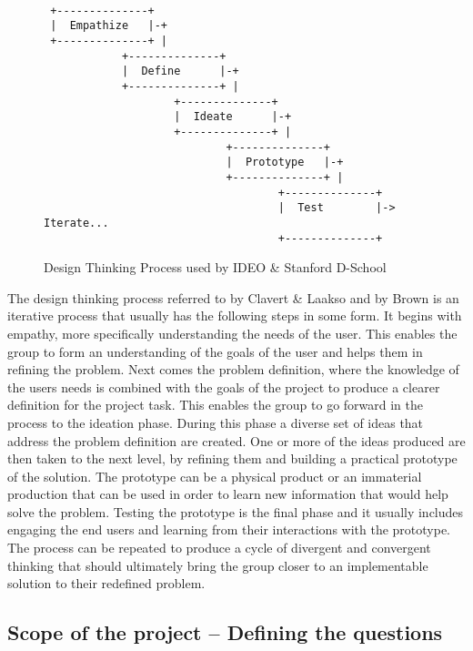 \documentclass[english,12pt,a4paper,pdftex]{article}
\begin{document}

\begin{figure}
\begin{verbatim}
 
 +--------------+
 |  Empathize   |-+
 +--------------+ |
            +--------------+
            |  Define      |-+
            +--------------+ |
                    +--------------+
                    |  Ideate      |-+
                    +--------------+ |
                            +--------------+
                            |  Prototype   |-+
                            +--------------+ |
                                    +--------------+
                                    |  Test        |-> Iterate...
                                    +--------------+
\end{verbatim}
\caption{Design Thinking Process used by IDEO \& Stanford D-School}
\label{fig:dt-process}
\end{figure}

The design thinking process referred to by Clavert \& Laakso \cite{Clavert} and by Brown \cite{Brown} is an iterative process that usually has the following steps in some form. It begins with empathy, more specifically understanding the needs of the user. This enables the group to form an understanding of the goals of the user and helps them in refining the problem. Next comes the problem definition, where the knowledge of the users needs is combined with the goals of the project to produce a clearer definition for the project task. This enables the group to go forward in the process to the ideation phase. During this phase a diverse set of ideas that address the problem definition are created. One or more of the ideas produced are then taken to the next level, by refining them and building a practical prototype of the solution. The prototype can be a physical product or an immaterial production that can be used in order to learn new information that would help solve the problem. Testing the prototype is the final phase and it usually includes engaging the end users and learning from their interactions with the prototype. \cite{Clavert} \cite{Brown} The process can be repeated to produce a cycle of divergent and convergent thinking that should ultimately bring the group closer to an implementable solution to their redefined problem.

\subsection{Scope of the project -- Defining the questions}
\end{document}
